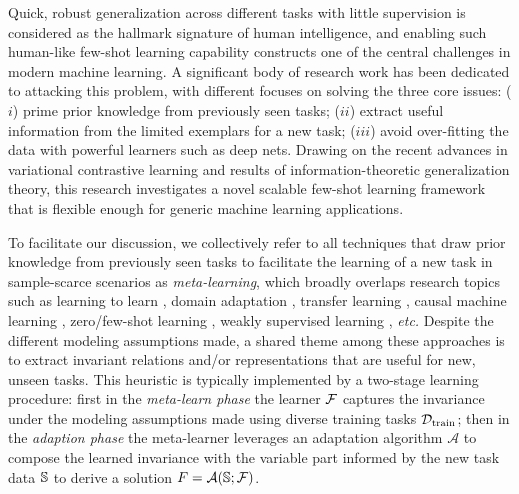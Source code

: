 \documentclass[nohyperref]{article}
\theoremstyle{plain}
\theoremstyle{definition}
\theoremstyle{remark}
\newcommand{\CA}{\mathcal{A}}
\newcommand{\train}{\text{train}}
\begin{document}
Quick, robust generalization across different tasks with little supervision is considered as the hallmark signature of human intelligence, and enabling such human-like few-shot learning capability constructs one of the central challenges in modern machine learning. A significant body of research work has been dedicated to attacking this problem, with different focuses on solving the three core issues: ($i$) prime prior knowledge from previously seen tasks; ($ii$) extract useful information from the limited exemplars for a new task; ($iii$) avoid over-fitting the data with powerful learners such as deep nets. Drawing on the recent advances in variational contrastive learning and results of information-theoretic generalization theory, this research investigates a novel scalable few-shot learning framework that is flexible enough for generic machine learning applications. 


To facilitate our discussion, we collectively refer to all techniques that draw prior knowledge from previously seen tasks to facilitate the learning of a new task in sample-scarce scenarios as {\it meta-learning}, which broadly overlaps research topics such as learning to learn \citep{thrun1998learning}, domain adaptation \citep{daume2009frustratingly}, transfer learning \citep{pan2009survey}, causal machine learning \citep{scholkopf2021toward}, zero/few-shot learning \citep{}, weakly supervised learning \citep{robinson2020strength}, {\it etc.} Despite the different modeling assumptions made, a shared theme among these approaches is to extract invariant relations and/or representations that are useful for new, unseen tasks. This heuristic is typically implemented by a two-stage learning procedure: first in the {\it meta-learn phase} the learner $\mathcal{F}$ captures the invariance under the modeling assumptions made using diverse training tasks $\CD_{\train}$; then in the {\it adaption phase} the meta-learner leverages an adaptation algorithm $\CA$ to compose the learned invariance with the variable part informed by the new task data $\mathbb{S}$ to derive a solution $F = \CA(\BS;\CF)$. 
\end{document}
